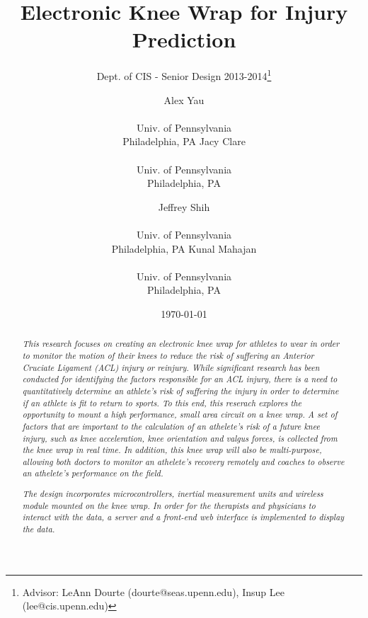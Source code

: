 \documentclass{sig-alternate}
\begin{document}
\nocite{*}
\title{Electronic Knee Wrap for Injury Prediction}
\subtitle{Dept. of CIS - Senior Design 2013-2014\thanks{Advisor: LeAnn Dourte (dourte@seas.upenn.edu), Insup Lee (lee@cis.upenn.edu)}}
\author{
\alignauthor Alex Yau \\  \\ Univ. of Pennsylvania \\ Philadelphia, PA
\alignauthor Jacy Clare \\  \\ Univ. of Pennsylvania \\ Philadelphia, PA
\and
\alignauthor Jeffrey Shih \\  \\ Univ. of Pennsylvania \\ Philadelphia, PA
\alignauthor Kunal Mahajan \\  \\ Univ. of Pennsylvania \\ Philadelphia, PA}
\date{\today}
\maketitle

\begin{abstract}

  \textit{This research focuses on creating an electronic knee wrap for athletes to wear in order to monitor the motion of their knees to reduce the risk of suffering an Anterior Cruciate Ligament (ACL) injury or reinjury. While significant research has been conducted for identifying the factors responsible for an ACL injury, there is a need to quantitatively determine an athlete's risk of suffering the injury in order to determine if an athlete is fit to return to sports. To this end, this reserach explores the opportunity to mount a high performance, small area circuit on a knee wrap. A set of factors that are important to the calculation of an athelete's risk of a future knee injury, such as knee acceleration, knee orientation and valgus forces, is collected from the knee wrap in real time. In addition, this knee wrap will also be multi-purpose, allowing both doctors to monitor an athelete's recovery remotely and coaches to observe an athelete's performance on the field.}

  \textit{The design incorporates microcontrollers, inertial measurement units and wireless module mounted on the knee wrap. In order for the therapists and physicians to interact with the data, a server and a front-end web interface is implemented to display the data.}

\end{abstract}
\end{document}
